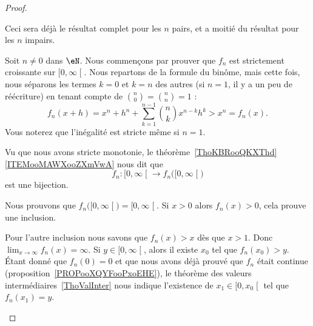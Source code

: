 \begin{proof}
\begin{subproof}
        \item[Pour \( n\) pair ou impair, bijection sur les positifs]
            Ceci sera déjà le résultat complet pour les \( n\) pairs, et a moitié du résultat pour les \( n\) impairs.
            \begin{subproof}
                \item[Stricte croissance]
                    Soit \( n\neq 0\) dans \( \eN\). Nous commençons par prouver que \( f_n\) est strictement croissante sur \( \mathopen[ 0 , \infty \mathclose[\). Nous repartons de la formule du binôme, mais cette fois, nous séparons les termes \( k=0\) et \( k=n\) des autres (si \( n=1\), il y a un peu de réécriture) en tenant compte de \( {n\choose 0}={n\choose n}=1\) :
                        \begin{equation}
                            f_n(x+h)=x^n+h^n+\sum_{k=1}^{n-1}{n\choose k}x^{n-k}h^k>x^n=f_n(x).
                        \end{equation}
                        Vous noterez que l'inégalité est stricte même si \( n=1\).

                        Vu que nous avons stricte monotonie, le théorème~\ref{ThoKBRooQKXThd}\ref{ITEMooMAWXooZXmVwA} nous dit que
                        \begin{equation}
                            f_n\colon \mathopen[ 0 , \infty \mathclose[\to f_n\big( \mathopen[ 0 , \infty \mathclose[ \big)
                        \end{equation}
                        est une bijection.
                    \item[Bijection]

                        Nous prouvons que \( f_n\big( \mathopen[ 0 , \infty \mathclose[ \big)=\mathopen[ 0 , \infty \mathclose[\). Si \( x>0\) alors \( f_n(x)>0\), cela prouve une inclusion.

                            Pour l'autre inclusion nous savons que \( f_n(x)>x\) dès que \( x>1\). Donc \( \lim_{x\to \infty} f_n(x)=\infty\). Si \( y\in \mathopen[ 0 , \infty \mathclose[\), alors il existe \( x_0\) tel que \( f_n(x_0)>y\). Étant donné que \( f_n(0)=0\) et que nous avons déjà prouvé que \( f_n\) était continue (proposition~\ref{PROPooXQYFooPxoEHE}), le théorème des valeurs intermédiaires~\ref{ThoValInter} nous indique l'existence de \( x_1\in \mathopen[ 0 , x_0 \mathclose[\) tel que \( f_n(x_1)=y\).

            \end{subproof}


\end{subproof}
\end{proof}
